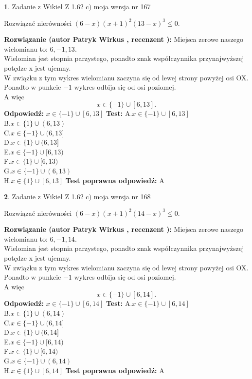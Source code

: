 \documentclass[12pt, a4paper]{article}
\theoremstyle{definition} %
\newtheorem{zad}{}
\newcommand{\zadStart}[1]{\begin{zad}#1\newline}
\newcommand{\zadStop}{\end{zad}}
\newcommand{\rozwStart}[2]{\noindent \textbf{Rozwiązanie (autor #1 , recenzent #2): }\newline}
\newcommand{\rozwStop}{\newline}
\newcommand{\odpStart}{\noindent \textbf{Odpowiedź:}\newline}
\newcommand{\odpStop}{\newline}
\newcommand{\testStart}{\noindent \textbf{Test:}\newline}
\newcommand{\testStop}{\newline}
\newcommand{\kluczStart}{\noindent \textbf{Test poprawna odpowiedź:}\newline}
\newcommand{\kluczStop}{\newline}
\begin{document}
\zadStart{Zadanie z Wikieł Z 1.62 c) moja wersja nr 167}

Rozwiązać nierówności $(6-x)(x+1)^{2}(13-x)^{3}\le0$.
\zadStop
\rozwStart{Patryk Wirkus}{}
Miejsca zerowe naszego wielomianu to: $6, -1, 13$.\\
Wielomian jest stopnia parzystego, ponadto znak współczynnika przy\linebreak najwyższej potędze x jest ujemny.\\ W związku z tym wykres wielomianu zaczyna się od lewej strony powyżej osi OX.\\
Ponadto w punkcie $-1$ wykres odbija się od osi poziomej.\\
A więc $$x \in \{-1\} \cup [6,13].$$
\rozwStop
\odpStart
$x \in \{-1\} \cup [6,13]$
\odpStop
\testStart
A.$x \in \{-1\} \cup [6,13]$\\
B.$x \in \{1\} \cup (6,13)$\\
C.$x \in \{-1\} \cup (6,13]$\\
D.$x \in \{1\} \cup (6,13]$\\
E.$x \in \{-1\} \cup [6,13)$\\
F.$x \in \{1\} \cup [6,13)$\\
G.$x \in \{-1\} \cup (6,13)$\\
H.$x \in \{1\} \cup [6,13]$
\testStop
\kluczStart
A
\kluczStop



\zadStart{Zadanie z Wikieł Z 1.62 c) moja wersja nr 168}

Rozwiązać nierówności $(6-x)(x+1)^{2}(14-x)^{3}\le0$.
\zadStop
\rozwStart{Patryk Wirkus}{}
Miejsca zerowe naszego wielomianu to: $6, -1, 14$.\\
Wielomian jest stopnia parzystego, ponadto znak współczynnika przy\linebreak najwyższej potędze x jest ujemny.\\ W związku z tym wykres wielomianu zaczyna się od lewej strony powyżej osi OX.\\
Ponadto w punkcie $-1$ wykres odbija się od osi poziomej.\\
A więc $$x \in \{-1\} \cup [6,14].$$
\rozwStop
\odpStart
$x \in \{-1\} \cup [6,14]$
\odpStop
\testStart
A.$x \in \{-1\} \cup [6,14]$\\
B.$x \in \{1\} \cup (6,14)$\\
C.$x \in \{-1\} \cup (6,14]$\\
D.$x \in \{1\} \cup (6,14]$\\
E.$x \in \{-1\} \cup [6,14)$\\
F.$x \in \{1\} \cup [6,14)$\\
G.$x \in \{-1\} \cup (6,14)$\\
H.$x \in \{1\} \cup [6,14]$
\testStop
\kluczStart
A
\kluczStop
\end{document}
